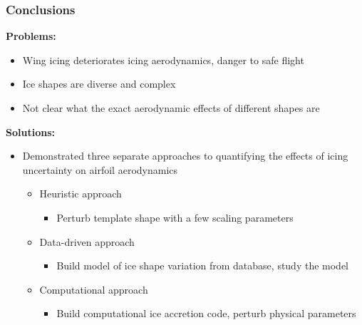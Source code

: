 \documentclass[9pt]{beamer}
\begin{document}
\begin{frame}
\frametitle{Conclusions}
\label{sec-3-8}

\textbf{Problems:}
\begin{itemize}
\item Wing icing deteriorates icing aerodynamics, danger to safe flight
\item Ice shapes are diverse and complex
\item Not clear what the exact aerodynamic effects of different shapes are
\end{itemize}
\textbf{Solutions:}
\begin{itemize}
\item Demonstrated three separate approaches to quantifying the effects of
  icing uncertainty on airfoil aerodynamics
\begin{itemize}
\item Heuristic approach
\begin{itemize}
\item Perturb template shape with a few scaling parameters
\end{itemize}
\item Data-driven approach
\begin{itemize}
\item Build model of ice shape variation from database, study the model
\end{itemize}
\item Computational approach
\begin{itemize}
\item Build computational ice accretion code, perturb physical parameters
\end{itemize}
\end{itemize}
\end{itemize}







 
\end{frame}
\end{document}
